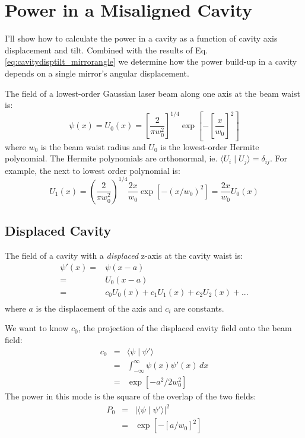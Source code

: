 \section{Power in a Misaligned Cavity}
\label{sec:cavitypower}
I'll show how to calculate the power in a cavity as a function of
cavity axis displacement and tilt. Combined with the results of
Eq. \ref{eq:cavitydisptilt_mirrorangle} we determine how the power
build-up in a cavity depends on a single mirror's angular
displacement.

The field of a lowest-order Gaussian laser beam along one axis at the beam waist is:
\begin{equation}
\psi(x) = U_0(x) = \left[ \frac{2}{\pi w_0^2} \right]^{1/4} \exp{\left[-\left[\frac{x}{w_0}\right]^2\right]}
\end{equation}
where $w_0$ is the beam waist radius and $U_0$ is the lowest-order
Hermite polynomial. The Hermite polynomials are orthonormal,
ie. $\langle U_i \mid U_j \rangle = \delta_{ij}$. For example, the
next to lowest order polynomial is:
\begin{equation}
U_1(x) = \left( \frac{2}{\pi w_0^2} \right)^{1/4} \frac{2x}{w_0}
\exp{[-(x/w_0)^2]} = \frac{2x}{w_0} U_0(x)
\end{equation}

\subsection{Displaced Cavity}
The field of a cavity with a \emph{displaced} z-axis at the cavity waist is:
\begin{align}
\psi \prime (x) =& \psi(x-a) \\
 =& U_0(x-a) \\
 =& c_0U_0(x) + c_1 U_1(x) + c_2 U_2(x) + ...\\
\end{align}
where $a$ is the displacement of the axis and $c_i$ are constants.

We want to know $c_0$, the projection of the displaced cavity field onto the beam field: 
\begin{eqnarray}
c_0 &=& \langle \psi \mid \psi \prime \rangle \\
&=& \int_{-\infty}^\infty \psi(x) \psi \prime(x) \, dx \\
 &=& \exp{[-a^2/2 w_0^2]}
\label{eq:c_0}
\end{eqnarray}
The power in this mode is the square of the overlap of the two fields: 
\begin{eqnarray}
P_0&=& \left| \langle \psi \mid \psi \prime \rangle \right| ^2\\ 
&=& \exp{[-[a/w_0]^2]} 
\end{eqnarray}


